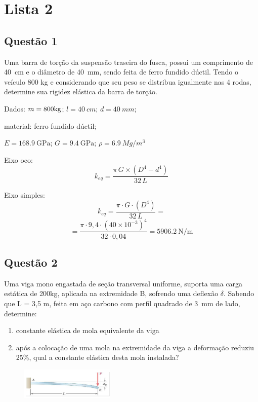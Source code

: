 \section{Lista 2}
\subsection{Questão 1}
Uma barra de torção da suspensão traseira do fusca, possui um comprimento de
\SI{40}{cm} e o diâmetro de \SI{40}{mm}, sendo feita de ferro fundido dúctil.
Tendo o veículo 800 kg e considerando que seu peso se distribua igualmente nas 4
rodas, determine sua rigidez elástica da barra de torção.

\resol
Dados: $m=800\kg$; $l = \SI{40}{cm}$; $d = \SI{40}{mm}$;

material: ferro fundido dúctil;

$ E=\SI{168,9}{\giga\pascal}$; $G =\SI{9,4}{\giga\pascal}$;
$ \rho =\SI{6,9}{Mg\per{m^3}} $

Eixo oco:
\[ k_{eq} = \frac{\pi\, G\times (D^4-d^4)}{32\,L} \]

Eixo simples:
\[
    k_{eq} = \frac{\pi\cdot G\cdot (D^4)}{32\,L}=
\]
\[
=\frac{\pi\cdot 9,4 \cdot (40\times 10^{-3})^{4} }{32\cdot
0,04}=\SI{5906,2}{\newton\per\meter}
\]
\subsection{Questão 2}
Uma viga mono engastada de seção transversal uniforme, suporta uma carga
estática de 200kg, aplicada na extremidade B, sofrendo uma deflexão $\delta$.
Sabendo que L = 3,5 m, feita em aço carbono com
perfil quadrado de \SI{3}{mm} de lado, determine:
\begin{enumerate}[label=\alph*)]
    \item constante elástica de mola equivalente da viga
    \item após a colocação de uma mola na extremidade da viga a deformação
        reduziu 25\%, qual a constante elástica desta mola instalada?
\end{enumerate}

\begin{figure}[ht]
    \centering
    \includegraphics[width=0.4\textwidth]{imagens/lista_2_questao_2.png}
\end{figure}

